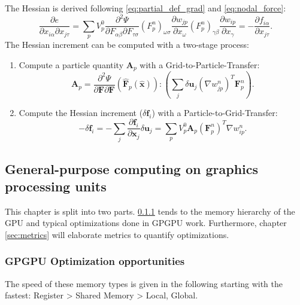 \documentclass[m,times]{cgMA}
\begin{document}
The Hessian is derived following \ref{eq:partial_def_grad} and \ref{eq:nodal_force}:
\begin{equation}
  \frac{\partial e}{\partial {x}_{i\alpha} \partial x_{j\tau}}
= \sum_p V^0_p\frac { \partial ^ { 2 } \Psi } { \partial  { F}_{\alpha \beta} \partial { F } _{\tau \sigma}}  (F^n_p)_{\omega \sigma}\frac{\partial w_{jp}}{\partial x_\omega} (F^n_p)_{\gamma\beta}\frac{\partial w_{ip}}{\partial x_\gamma} = -\frac{\partial {f}_{i\alpha}}{\partial x_{j\tau}}.
\end{equation}
The Hessian increment can be computed with a two-stage process:
\begin{enumerate}
  \item Compute a particle quantity $\boldsymbol{A}_p$ with a Grid-to-Particle-Transfer:
    \begin{equation}\label{eq:Ap}
    \boldsymbol{A}_p = \frac { \partial ^ { 2 } \Psi } { \partial \boldsymbol { F } \partial \boldsymbol { F } } ( \hat { \boldsymbol { F } } _ { p } ( \hat { \boldsymbol { x } } )) : \left(\sum_j \delta \boldsymbol{u}_j (\nabla w_{jp}^n)^T \boldsymbol{F}^n_p\right).
    \end{equation}
  \item Compute the Hessian increment ($\delta \boldsymbol{f}_i$) with a Particle-to-Grid-Transfer:
    \begin{equation}\label{eq:delta_f}
  - \delta \boldsymbol{f}_i = - \sum_j \frac{\partial \boldsymbol{f}_i}{\partial \boldsymbol{x}_j} \delta \boldsymbol{u}_j = \sum_p V_p^0 \boldsymbol{A}_p(\boldsymbol{F}^n_p)^T \nabla w_{ip}^n.
\end{equation}
\end{enumerate}
\clearpage
\subsection{General-purpose computing on graphics processing units}\label{sec:gpgpu}
This chapter is split into two parts. \ref{sec:optim} tends to the memory hierarchy of the GPU and typical optimizations done in GPGPU work. Furthermore, chapter \ref{sec:metrics} will elaborate metrics to quantify optimizations.
\subsubsection {GPGPU Optimization opportunities}\label{sec:optim}
The speed of these memory types is given in the following starting with the fastest:
Register > Shared Memory > Local, Global.
\end{document}

